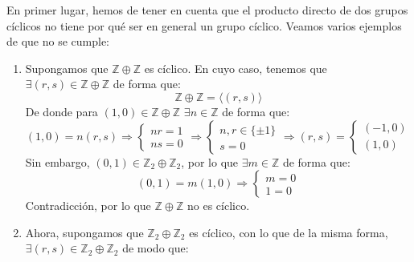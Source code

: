 \begin{ejemplo}
    En primer lugar, hemos de tener en cuenta que el producto directo de dos grupos cíclicos no tiene por qué ser en general un grupo cíclico. Veamos varios ejemplos de que no se cumple:
    \begin{enumerate}
        \item Supongamos que $\mathbb{Z}\oplus\mathbb{Z}$ es cíclico. En cuyo caso, tenemos que $\exists (r,s)\in \mathbb{Z}\oplus\mathbb{Z}$ de forma que:
            \begin{equation*}
                \mathbb{Z}\oplus\mathbb{Z} = \langle (r,s) \rangle 
            \end{equation*}
            De donde para $(1,0)\in \mathbb{Z}\oplus\mathbb{Z}$ $\exists n\in \mathbb{Z}$ de forma que:
            \begin{equation*}
                (1, 0) = n(r,s) \Longrightarrow \left\{\begin{array}{l}
                    nr = 1 \\
                    ns = 0
                \end{array}\right. \Longrightarrow \left\{\begin{array}{l}
                    n,r \in \{\pm 1\} \\
                    s = 0 
                \end{array}\right. \Longrightarrow (r,s) = \left\{\begin{array}{l}
                (-1, 0) \\
                (1, 0)
                \end{array}\right.
            \end{equation*}
            Sin embargo, $(0,1)\in \mathbb{Z}_2\oplus \mathbb{Z}_2$, por lo que $\exists m\in \mathbb{Z}$ de forma que:
            \begin{equation*}
                (0,1) = m(1,0) \Longrightarrow \left\{\begin{array}{l}
                    m = 0 \\
                    1 = 0
                \end{array}\right.
            \end{equation*}
            Contradicción, por lo que $\mathbb{Z}\oplus \mathbb{Z}$ no es cíclico.
        \item Ahora, supongamos que $\mathbb{Z}_2\oplus\mathbb{Z}_2$ es cíclico, con lo que de la misma forma, $\exists (r,s)\in \mathbb{Z}_2\oplus\mathbb{Z}_2$ de modo que:
            \begin{equation*}

\end{equation*}
\end{enumerate}
\end{ejemplo}
